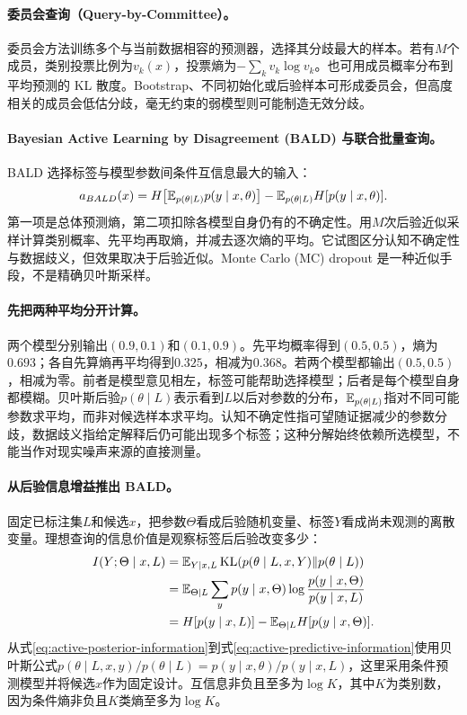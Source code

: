 \paragraph{委员会查询（Query-by-Committee）。}
委员会方法训练多个与当前数据相容的预测器，选择其分歧最大的样本\cite{seung1992qbc}。若有$M$个成员，类别投票比例为$v_k(x)$，投票熵为$-\sum_kv_k\log v_k$。也可用成员概率分布到平均预测的 KL 散度。Bootstrap、不同初始化或后验样本可形成委员会，但高度相关的成员会低估分歧，毫无约束的弱模型则可能制造无效分歧。

\paragraph{Bayesian Active Learning by Disagreement (BALD) 与联合批量查询。}
BALD 选择标签与模型参数间条件互信息最大的输入\cite{houlsby2011bald}：
\begin{equation}
 a_{BALD}(x)=H\!\left[\mathbb{E}_{p(\theta\mid L)}p(y\mid x,\theta)\right]
 -\mathbb{E}_{p(\theta\mid L)}H[p(y\mid x,\theta)].
\end{equation}
第一项是总体预测熵，第二项扣除各模型自身仍有的不确定性。用$M$次后验近似采样计算类别概率、先平均再取熵，并减去逐次熵的平均。它试图区分认知不确定性与数据歧义，但效果取决于后验近似。Monte Carlo (MC) dropout 是一种近似手段，不是精确贝叶斯采样\cite{gal2017deepactive}。

\paragraph{先把两种平均分开计算。}
两个模型分别输出$(0.9,0.1)$和$(0.1,0.9)$。先平均概率得到$(0.5,0.5)$，熵为$0.693$；各自先算熵再平均得到$0.325$，相减为$0.368$。若两个模型都输出$(0.5,0.5)$，相减为零。前者是模型意见相左，标签可能帮助选择模型；后者是每个模型自身都模糊。贝叶斯后验$p(\theta\mid L)$表示看到$L$以后对参数的分布，$\mathbb{E}_{p(\theta\mid L)}$指对不同可能参数求平均，而非对候选样本求平均。认知不确定性指可望随证据减少的参数分歧，数据歧义指给定解释后仍可能出现多个标签；这种分解始终依赖所选模型，不能当作对现实噪声来源的直接测量。

\paragraph{从后验信息增益推出 BALD。}
固定已标注集$L$和候选$x$，把参数$\Theta$看成后验随机变量、标签$Y$看成尚未观测的离散变量。理想查询的信息价值是观察标签后后验改变多少：
\begin{align}
 I(Y;\Theta\mid x,L)
 &=\mathbb{E}_{Y\mid x,L}\operatorname{KL}(p(\theta\mid L,x,Y)\|p(\theta\mid L))\label{eq:active-posterior-information}\\
 &=\mathbb{E}_{\Theta\mid L}\sum_yp(y\mid x,\Theta)
 \log\frac{p(y\mid x,\Theta)}{p(y\mid x,L)}\label{eq:active-predictive-information}\\
 &=H[p(y\mid x,L)]-\mathbb{E}_{\Theta\mid L}H[p(y\mid x,\Theta)].
\end{align}
从式\eqref{eq:active-posterior-information}到式\eqref{eq:active-predictive-information}使用贝叶斯公式$p(\theta\mid L,x,y)/p(\theta\mid L)=p(y\mid x,\theta)/p(y\mid x,L)$，这里采用条件预测模型并将候选$x$作为固定设计。互信息非负且至多为$\log K$，其中$K$为类别数，因为条件熵非负且$K$类熵至多为$\log K$。

